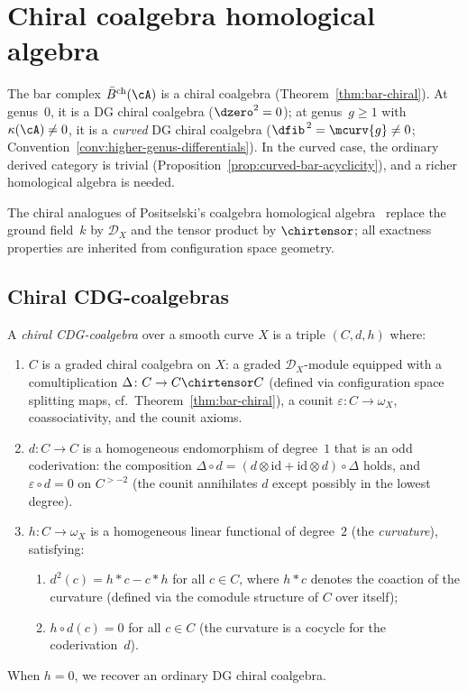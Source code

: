 \section{Chiral coalgebra homological algebra}
\label{sec:chiral-coalgebra-homalg}

The bar complex $\bar{B}^{\mathrm{ch}}(\cA)$ is a chiral coalgebra
(Theorem~\ref{thm:bar-chiral}).  At genus~$0$, it is a
DG chiral coalgebra ($\dzero^2 = 0$); at genus~$g \geq 1$ with
$\kappa(\cA) \neq 0$, it is a \emph{curved} DG chiral coalgebra
($\dfib^{\,2} = \mcurv{g} \neq 0$; Convention~\ref{conv:higher-genus-differentials}).  In the curved case, the ordinary
derived category is trivial
(Proposition~\ref{prop:curved-bar-acyclicity}), and a richer
homological algebra is needed.

The chiral analogues of Positselski's coalgebra homological
algebra~\cite{Positselski11} replace the ground field~$k$ by
$\mathcal{D}_X$ and the tensor product by $\chirtensor$; all
exactness properties are inherited from configuration space geometry.

\subsection{Chiral CDG-coalgebras}
\label{subsec:chiral-CDG-coalgebra}

\begin{definition}\label{def:chiral-CDG-coalgebra}
A \emph{chiral CDG-coalgebra} over a smooth curve $X$ is a triple
$(C, d, h)$ where:
\begin{enumerate}
\item $C$ is a graded chiral coalgebra on $X$: a graded
  $\mathcal{D}_X$-module equipped with a comultiplication
  $\Delta\colon C \to C \chirtensor C$
  (defined via configuration space splitting maps,
  cf.\ Theorem~\ref{thm:bar-chiral}),
  a counit $\varepsilon\colon C \to \omega_X$, coassociativity,
  and the counit axioms.
\item $d\colon C \to C$ is a homogeneous endomorphism of degree~$1$
  that is an odd coderivation: the composition
  $\Delta \circ d = (d \otimes \mathrm{id} +
  \mathrm{id} \otimes d) \circ \Delta$
  holds, and $\varepsilon \circ d = 0$ on $C^{>-2}$
  (the counit annihilates $d$ except possibly in the lowest degree).
\item $h\colon C \to \omega_X$ is a homogeneous linear functional
  of degree~$2$ (the \emph{curvature}), satisfying:
  \begin{enumerate}
  \item $d^2(c) = h \ast c - c \ast h$ for all $c \in C$,
    where $h \ast c$ denotes the coaction of the curvature
    (defined via the comodule structure of $C$ over itself);
  \item $h \circ d(c) = 0$ for all $c \in C$
    (the curvature is a cocycle for the coderivation~$d$).
  \end{enumerate}
\end{enumerate}
When $h = 0$, we recover an ordinary DG chiral coalgebra.
\end{definition}

